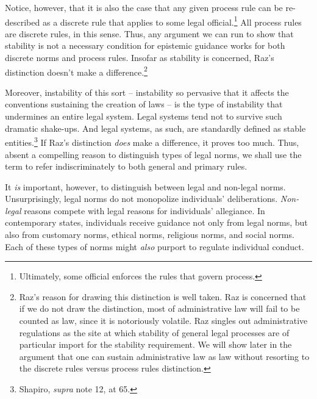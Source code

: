 Notice, however, that it is also the case that any given process rule
can be re-described as a discrete rule that applies to some legal
official.\footnote{Ultimately, some official enforces the rules that
  govern process.} All process rules are discrete rules, in this sense.
Thus, any argument we can run to show that stability is not a necessary
condition for epistemic guidance works for both discrete norms and
process rules. Insofar as stability is concerned, Raz's distinction
doesn't make a difference.\footnote{Raz's reason for drawing this
  distinction is well taken. Raz is concerned that if we do not draw the
  distinction, most of administrative law will fail to be counted as
  law, since it is notoriously volatile. Raz singles out administrative
  regulations as the site at which stability of general legal processes
  are of particular import for the stability requirement. We will show
  later in the argument that one can sustain administrative law as law
  without resorting to the discrete rules versus process rules
  distinction.}

Moreover, instability of this sort -- instability so pervasive that it
affects the conventions sustaining the creation of laws -- is the type
of instability that undermines an entire legal system. Legal systems
tend not to survive such dramatic shake-ups. And legal systems, as such,
are standardly defined as stable entities.\footnote{Shapiro,
  \emph{supra} note 12, at 65.} If Raz's distinction \emph{does} make a
difference, it proves too much. Thus, absent a compelling reason to
distinguish types of legal norms, we shall use the term to refer
indiscriminately to both general and primary rules.

It \emph{is} important, however, to distinguish between legal and
non-legal norms. Unsurprisingly, legal norms do not monopolize
individuals' deliberations. \emph{Non-legal} reasons compete with legal
reasons for individuals' allegiance. In contemporary states, individuals
receive guidance not only from legal norms, but also from customary
norms, ethical norms, religious norms, and social norms. Each of these
types of norms might \emph{also} purport to regulate individual conduct.

